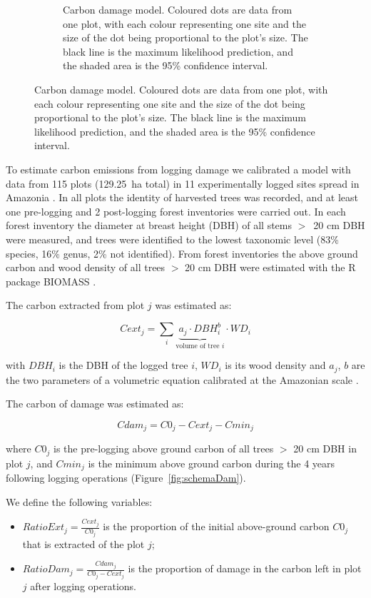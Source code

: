 \documentclass{article}
\begin{document}
\begin{figure}
\begin{subfigure}[b]{0.55\textwidth}
    \caption{Carbon damage model. Coloured dots are data from one plot, with each colour representing one site and the size of the dot being proportional to the plot's size. The black line is the maximum likelihood prediction, and the shaded area is the 95\% confidence interval.}\label{fig:damModel}
    \end{subfigure}
\end{figure}

To estimate carbon emissions from logging damage we calibrated a model with data from 115 plots (129.25~ha total) in 11 experimentally logged sites spread in Amazonia \cite{Sist2015}. In all plots the identity of harvested trees was recorded, and at least one pre-logging and 2 post-logging forest inventories were carried out. In each forest inventory the diameter at breast height (DBH) of all stems $>$~20 cm DBH were measured, and trees were identified to the lowest taxonomic level (83\% species, 16\% genus, 2\% not identified). 
From forest inventories the above ground carbon and wood density of all trees $>$ 20 cm DBH  were estimated with the R package BIOMASS \cite{Rejou-Mechain2017}. 

The carbon extracted from plot $j$ was estimated as: 

\begin{equation}
    Cext_j = \sum_{i} \underbrace{a_j \cdot DBH_i^b}_{\text{volume of tree $i$}} \cdot WD_i
\end{equation}

with $DBH_i$ is the DBH of the logged tree $i$, $WD_i$ is its wood density and $a_j$, $b$ are the two parameters of a volumetric equation calibrated at the Amazonian scale \cite{Piponiotc}. 

The carbon of damage was estimated as: 

\begin{equation}
    Cdam_j = C0_j - Cext_j - Cmin_j
\end{equation}

where $C0_j$ is the pre-logging above ground carbon of all trees $>$ 20 cm DBH in plot $j$, and $Cmin_j$ is the minimum above ground carbon during the 4 years following logging operations (Figure~\ref{fig:schemaDam}). 

We define the following variables: 

\begin{itemize}
    \item $RatioExt_j=\frac{Cext_j}{C0_j}$ is the proportion of the initial above-ground carbon $C0_j$ that is extracted of the plot $j$; 
    \item $RatioDam_j = \frac{Cdam_j}{C0_j-Cext_j}$ is the proportion of damage in the carbon left in plot $j$ after logging operations. 
\end{itemize}
\end{document}
